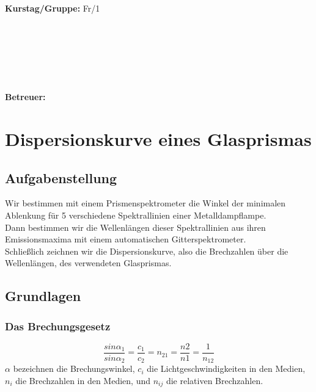 \documentclass{article}
\begin{document}
\begin{verbatim}


\end{verbatim}
			\begin{flushleft}
			\textbf{\Large{Kurstag/Gruppe:}} \Large{Fr/1}
			\end{flushleft}

\begin{verbatim}






\end{verbatim}
			\begin{flushleft}
			\LARGE{\textbf{Betreuer:}}	\Large{}	
			\end{flushleft}
\newpage	

\section{Dispersionskurve eines Glasprismas}

\subsection{Aufgabenstellung}
Wir bestimmen mit einem Prismenspektrometer die Winkel der minimalen Ablenkung für 5 verschiedene Spektrallinien einer Metalldampflampe.\\ Dann bestimmen wir die Wellenlängen dieser Spektrallinien aus ihren Emissionsmaxima mit einem automatischen Gitterspektrometer.\\ Schließlich zeichnen wir die Dispersionskurve, also die Brechzahlen über die Wellenlängen, des verwendeten Glasprismas. 
\subsection{Grundlagen}
\subsubsection*{Das Brechungsgesetz}
\begin{equation}
\label{brechungsgesetz}
\frac{sin\alpha_1}{sin\alpha_2}=\frac{c_1}{c_2}=n_{21}=\frac{n2}{n1}=\frac{1}{n_{12}}
\end{equation}
$\alpha$ bezeichnen die Brechungswinkel, $c_i$ die Lichtgeschwindigkeiten in den Medien, $n_i$ die Brechzahlen in den Medien, und $n_{ij}$ die relativen Brechzahlen. \\
\\
\end{document}
